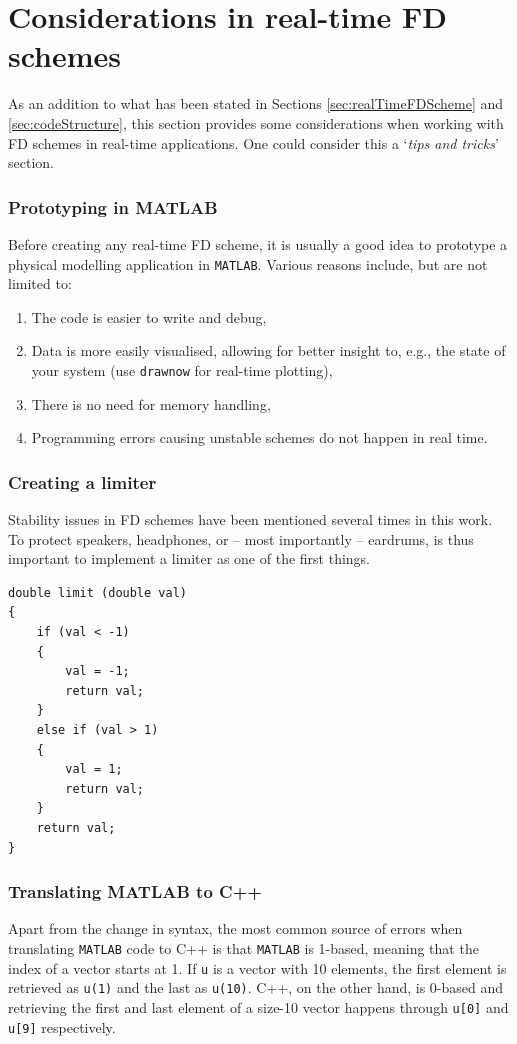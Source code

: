\section{Considerations in real-time FD schemes}
As an addition to what has been stated in Sections \ref{sec:realTimeFDScheme} and \ref{sec:codeStructure}, this section provides some considerations when working with FD schemes in real-time applications. One could consider this a `\textit{tips and tricks}' section. 

\subsubsection{Prototyping in MATLAB}
Before creating any real-time FD scheme, it is usually a good idea to prototype a physical modelling application in \texttt{MATLAB}. Various reasons include, but are not limited to:
\begin{enumerate}
    \item The code is easier to write and debug,
    \item Data is more easily visualised, allowing for better insight to, e.g., the state of your system (use \texttt{drawnow} for real-time plotting),
    \item There is no need for memory handling,
    \item Programming errors causing unstable schemes do not happen in real time.
\end{enumerate}

\subsubsection{Creating a limiter}
Stability issues in FD schemes have been mentioned several times in this work. To protect speakers, headphones, or -- most importantly -- eardrums, is thus important to implement a limiter as one of the first things. 

\setlstCpp
\begin{lstlisting}
double limit (double val)
{
    if (val < -1)
    {
        val = -1;
        return val;
    }
    else if (val > 1)
    {
        val = 1;
        return val;
    }
    return val;
}
\end{lstlisting}

\subsubsection{Translating MATLAB to C++}
Apart from the change in syntax, the most common source of errors when translating \texttt{MATLAB} code to C++ is that \texttt{MATLAB} is 1-based, meaning that the index of a vector starts at 1. If \texttt{u} is a vector with 10 elements, the first element is retrieved as \texttt{u(1)} and the last as \texttt{u(10)}. C++, on the other hand, is 0-based and retrieving the first and last element of a size-10 vector happens through \texttt{u[0]} and \texttt{u[9]} respectively. 

